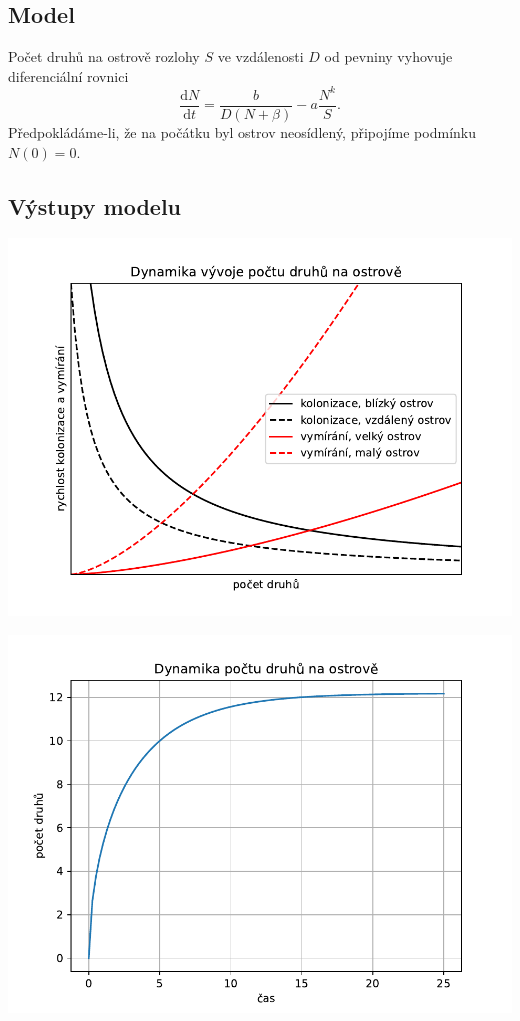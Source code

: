 \documentclass[handouts]{beamer}
\begin{document}
\begin{frame}
\bigskip
\subsection{Model}

Počet druhů na ostrově rozlohy $S$ ve
vzdálenosti $D$ od pevniny vyhovuje diferenciální rovnici
$$
  \frac{\mathrm dN}{\mathrm dt}= \frac b{D(N+\beta)}-a\frac {N^k}S.
$$
Předpokládáme-li, že na počátku byl ostrov neosídlený, připojíme
podmínku $N(0)=0$.

\subsection{Výstupy modelu}


\begin{minipage}[t]{0.5\linewidth}
  \includegraphics[width=\linewidth]{ostrov1.pdf}
\end{minipage}\begin{minipage}[t]{0.5\linewidth}
  \includegraphics[width=\linewidth]{ostrov2.pdf}
\end{minipage}


\end{frame}
\end{document}
